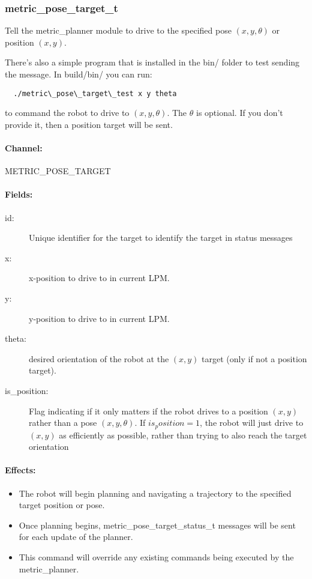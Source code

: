 \documentclass{article}
\begin{document}
\subsubsection{metric\_pose\_target\_t}

Tell the metric\_planner module to drive to the specified pose $(x,y,\theta)$ or position $(x,y)$.

There's also a simple program that is installed in the bin/ folder to test sending the message. In build/bin/ you can 
run:

\begin{verbatim}
  ./metric\_pose\_target\_test x y theta
\end{verbatim}

to command the robot to drive to $(x,y,\theta)$. The $\theta$ is optional. If you don't provide it, then a position 
target will be sent.

\paragraph{Channel:}

METRIC\_POSE\_TARGET

\paragraph{Fields:}

\begin{description}
  \item[id:] Unique identifier for the target to identify the target in status messages
  \item[x:] x-position to drive to in current LPM.
  \item[y:] y-position to drive to in current LPM.
  \item[theta:] desired orientation of the robot at the $(x,y)$ target (only if not a position target).
  \item[is\_position:] Flag indicating if it only matters if the robot drives to a position $(x,y)$ rather than a 
pose $(x, y, \theta)$. If $is_position = 1$, the robot will just drive to $(x,y)$ as efficiently as possible, rather 
than trying to also reach the target orientation
\end{description}

\paragraph{Effects:}

\begin{itemize}
  \item The robot will begin planning and navigating a trajectory to the specified target position or pose.
  \item Once planning begins, metric\_pose\_target\_status\_t messages will be sent for each update of the planner.
  \item This command will override any existing commands being executed by the metric\_planner.
\end{itemize}
\end{document}
